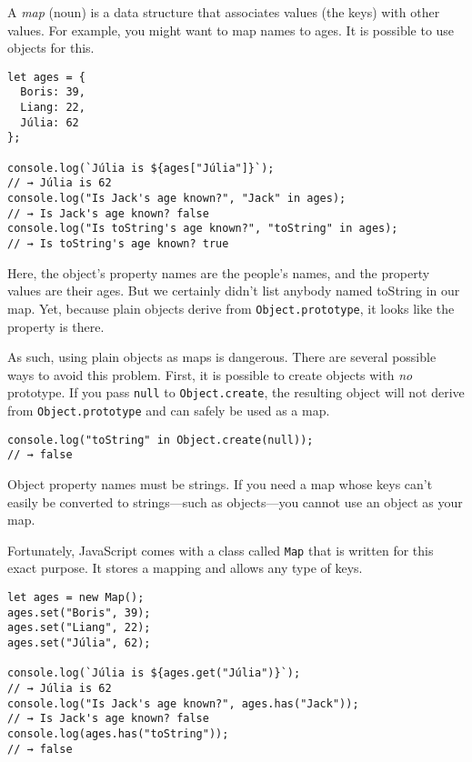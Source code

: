 A \emph{map} (noun) is a data structure that associates values (the keys) with other values. For example, you might want to map names to ages. It is possible to use objects for this.

\begin{lstlisting}
let ages = {
  Boris: 39,
  Liang: 22,
  Júlia: 62
};

console.log(`Júlia is ${ages["Júlia"]}`);
// → Júlia is 62
console.log("Is Jack's age known?", "Jack" in ages);
// → Is Jack's age known? false
console.log("Is toString's age known?", "toString" in ages);
// → Is toString's age known? true
\end{lstlisting}
\noindent{}

Here, the object's property names are the people's names, and the property values are their ages. But we certainly didn't list anybody named toString in our map. Yet, because plain objects derive from \lstinline`Object.prototype`, it looks like the property is there.

As such, using plain objects as maps is dangerous. There are several possible ways to avoid this problem. First, it is possible to create objects with \emph{no} prototype. If you pass \lstinline`null` to \lstinline`Object.create`, the resulting object will not derive from \lstinline`Object.prototype` and can safely be used as a map.

\begin{lstlisting}
console.log("toString" in Object.create(null));
// → false
\end{lstlisting}
\noindent{}

Object property names must be strings. If you need a map whose keys can't easily be converted to strings—such as objects—you cannot use an object as your map.

Fortunately, JavaScript comes with a class called \lstinline`Map` that is written for this exact purpose. It stores a mapping and allows any type of keys.

\begin{lstlisting}
let ages = new Map();
ages.set("Boris", 39);
ages.set("Liang", 22);
ages.set("Júlia", 62);

console.log(`Júlia is ${ages.get("Júlia")}`);
// → Júlia is 62
console.log("Is Jack's age known?", ages.has("Jack"));
// → Is Jack's age known? false
console.log(ages.has("toString"));
// → false
\end{lstlisting}
\noindent{}

